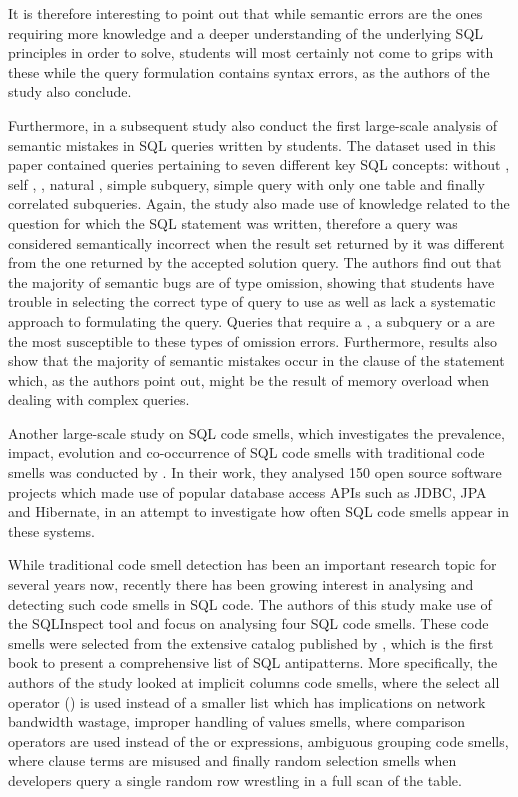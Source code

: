 It is therefore interesting to point out that while semantic errors are the ones requiring more knowledge and a deeper understanding of the underlying SQL principles in order to solve, students will most certainly not come to grips with these while the query formulation contains syntax errors, as the authors of the study also conclude. 

Furthermore, in a subsequent study \citet{P009} also conduct the first large-scale analysis of semantic mistakes in SQL  queries written by students. The dataset used in this paper contained queries pertaining to seven different key SQL concepts:  without , self , , natural , simple subquery, simple query with only one table and finally correlated subqueries. Again, the study also made use of knowledge related to the question for which the SQL statement was written, therefore a query was considered semantically incorrect when the result set returned by it was different from the one returned by the accepted solution query. The authors find out that the majority of semantic bugs are of type omission, showing that students have trouble in selecting the correct type of query to use as well as lack a systematic approach to formulating the query. Queries that require a , a subquery or a  are the most susceptible to these types of omission errors. Furthermore, results also show that the majority of semantic mistakes occur in the  clause of the  statement which, as the authors point out, might be the result of memory overload when dealing with complex queries.

Another large-scale study on SQL code smells, which investigates the prevalence, impact, evolution and co-occurrence of SQL code smells with traditional code smells was conducted by \citet{P010}. In their work, they analysed 150 open source software projects which made use of popular database access APIs such as JDBC, JPA and Hibernate, in an attempt to investigate how often SQL code smells appear in these systems. 

While traditional code smell detection has been an important research topic for several years now, recently there has been growing interest in analysing and detecting such code smells in SQL code. The authors of this study make use of the SQLInspect tool and focus on analysing four SQL code smells. These code smells were selected from the extensive catalog published by \citet{P998}, which is the first book to present a comprehensive list of SQL antipatterns. More specifically, the authors of the study looked at implicit columns code smells, where the select all operator (\sql{*}) is used instead of a smaller list which has implications on network bandwidth wastage, improper handling of  values smells, where comparison operators are used instead of the  or  expressions, ambiguous grouping code smells, where  clause terms are misused and finally random selection smells when developers query a single random row wrestling in a full scan of the table. 

